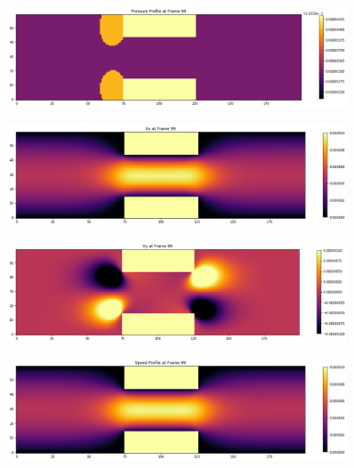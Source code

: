 \documentclass[11pt]{article}
\begin{document}
\begin{center}
\begin{figure}
\includegraphics[width=0.90\textwidth]{lbm_pbc_pressure.png}
\end{figure}

\begin{figure}
\includegraphics[width=0.90\textwidth]{lbm_pbc_ux.png}
\end{figure}

\begin{figure}
\includegraphics[width=0.90\textwidth]{lbm_pbc_uy.png}
\end{figure}

\begin{figure}
\includegraphics[width=0.90\textwidth]{lbm_pbc_speed.png}
\end{figure}
\end{center}
\end{document}
